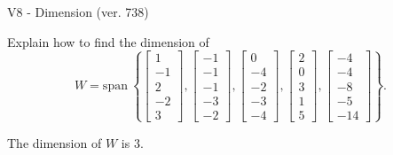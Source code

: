 \begin{exercise}
  \begin{exerciseTitle}V8 - Dimension (ver. 738)\end{exerciseTitle}
  \begin{exerciseStatement}
    Explain how to find the dimension of 
\[W=\mathrm{span}\ \left\{\left[\begin{array}{r}
1 \\
-1 \\
2 \\
-2 \\
3
\end{array}\right] , \left[\begin{array}{r}
-1 \\
-1 \\
-1 \\
-3 \\
-2
\end{array}\right] , \left[\begin{array}{r}
0 \\
-4 \\
-2 \\
-3 \\
-4
\end{array}\right] , \left[\begin{array}{r}
2 \\
0 \\
3 \\
1 \\
5
\end{array}\right] , \left[\begin{array}{r}
-4 \\
-4 \\
-8 \\
-5 \\
-14
\end{array}\right]\right\}.\]



  \end{exerciseStatement}
  \begin{exerciseAnswer}
   The dimension of \(W\) is  \(3\).
  


  \end{exerciseAnswer}
\end{exercise}